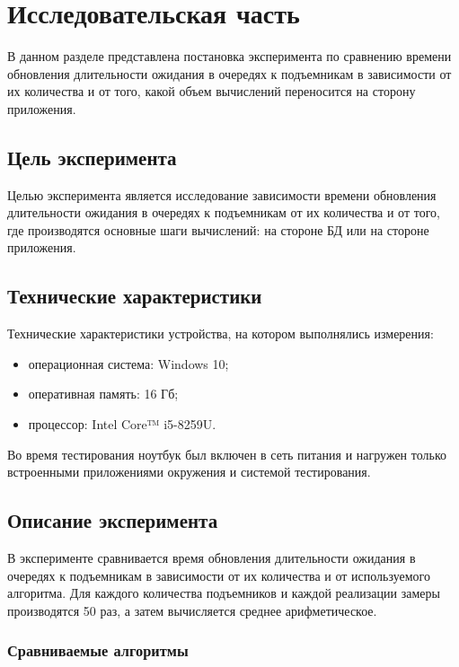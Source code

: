 \chapter{Исследовательская часть}

В данном разделе представлена постановка эксперимента по сравнению времени обновления длительности ожидания в очередях к подъемникам в зависимости от их количества и от того, какой объем вычислений переносится на сторону приложения.


\section{Цель эксперимента}

Целью эксперимента является исследование зависимости времени обновления длительности ожидания в очередях к подъемникам от их количества и от того, где производятся основные шаги вычислений: на стороне БД или на стороне приложения.

\section{Технические характеристики}

Технические характеристики устройства, на котором выполнялись измерения:

\begin{itemize}
	\item операционная система: Windows 10;
	\item оперативная память: 16 Гб;
	\item процессор: Intel Core™ i5-8259U.
\end{itemize}

Во время тестирования ноутбук был включен в сеть питания и нагружен только встроенными приложениями окружения и системой тестирования.


\section{Описание эксперимента}

В эксперименте сравнивается время обновления длительности ожидания в очередях к подъемникам в зависимости от их количества и от используемого алгоритма. Для каждого количества подъемников и каждой реализации замеры производятся 50 раз, а затем вычисляется среднее арифметическое.

\subsection{Сравниваемые алгоритмы}

